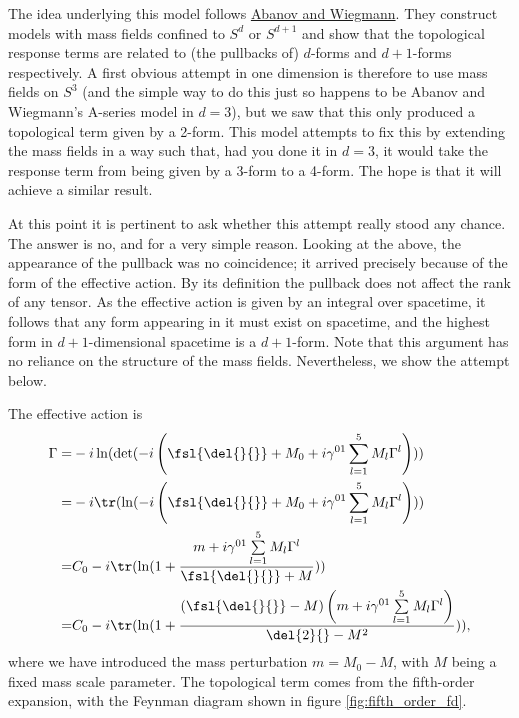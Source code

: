 The idea underlying this model follows \href{https://arxiv.org/pdf/hep-th/9911025.pdf}{Abanov and Wiegmann}. They construct models with mass fields confined to $S^{d}$ or $S^{d + 1}$ and show that the topological response terms are related to (the pullbacks of) $d$-forms and $d + 1$-forms respectively. A first obvious attempt in one dimension is therefore to use mass fields on $S^{3}$ (and the simple way to do this just so happens to be Abanov and Wiegmann's A-series model in $d = 3$), but we saw that this only produced a topological term given by a 2-form. This model attempts to fix this by extending the mass fields in a way such that, had you done it in $d = 3$, it would take the response term from being given by a 3-form to a 4-form. The hope is that it will achieve a similar result.

At this point it is pertinent to ask whether this attempt really stood any chance. The answer is no, and for a very simple reason. Looking at the above, the appearance of the pullback was no coincidence; it arrived precisely because of the form of the effective action. By its definition the pullback does not affect the rank of any tensor. As the effective action is given by an integral over spacetime, it follows that any form appearing in it must exist on spacetime, and the highest form in $d + 1$-dimensional spacetime is a $d + 1$-form. Note that this argument has no reliance on the structure of the mass fields. Nevertheless, we show the attempt below.

The effective action is
\begin{align*}
	\Gamma =& -i\ln(\det(-i\left(\fsl{\del{}{}} + M_{0} + i\gamma^{01}\sum\limits_{l = 1}^{5}M_{l}\Gamma^{l}\right))) \\
	       =& -i\tr(\ln(-i\left(\fsl{\del{}{}} + M_{0} + i\gamma^{01}\sum\limits_{l = 1}^{5}M_{l}\Gamma^{l}\right))) \\
	       =& C_{0} - i\tr(\ln(1 + \frac{m + i\gamma^{01}\sum\limits_{l = 1}^{5}M_{l}\Gamma^{l}}{\fsl{\del{}{}} + M})) \\
	       =& C_{0} - i\tr(\ln(1 + \frac{(\fsl{\del{}{}} - M)\left(m + i\gamma^{01}\sum\limits_{l = 1}^{5}M_{l}\Gamma^{l}\right)}{\del{2}{} - M^{2}})),
\end{align*}
where we have introduced the mass perturbation $m = M_{0} - M$, with $M$ being a fixed mass scale parameter. The topological term comes from the fifth-order expansion, with the Feynman diagram shown in figure \ref{fig:fifth_order_fd}.

